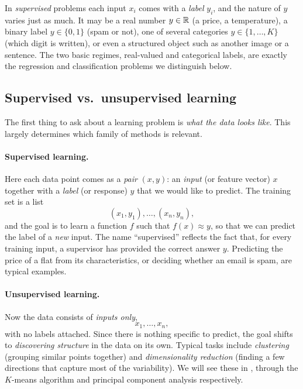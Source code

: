 In \emph{supervised} problems each input $x_i$ comes with a \emph{label} $y_i$,
and the nature of $y$ varies just as much. It may be a real number
$y \in \mathbb{R}$ (a price, a temperature), a binary label $y \in \{0, 1\}$ (spam or
not), one of several categories $y \in \{1, \dots, K\}$ (which digit is written),
or even a structured object such as another image or a sentence. The two basic
regimes, real-valued and categorical labels, are exactly the regression and
classification problems we distinguish below.

\subsection{Supervised vs.\ unsupervised learning}

The first thing to ask about a learning problem is \emph{what the data looks
like}. This largely determines which family of methods is relevant.

\paragraph{Supervised learning.}
Here each data point comes as a \emph{pair} $(x, y)$: an \emph{input} (or
feature vector) $x$ together with a \emph{label} (or response) $y$ that we would
like to predict. The training set is a list
\[
(x_1, y_1), \dots, (x_n, y_n),
\]
and the goal is to learn a function $f$ such that $f(x) \approx y$, so that we
can predict the label of a \emph{new} input. The name ``supervised'' reflects
the fact that, for every training input, a supervisor has provided the correct
answer $y$. Predicting the price of a flat from its characteristics, or deciding
whether an email is spam, are typical examples.

\paragraph{Unsupervised learning.}
Now the data consists of \emph{inputs only},
\[
x_1, \dots, x_n,
\]
with no labels attached. Since there is nothing specific to predict, the goal
shifts to \emph{discovering structure} in the data on its own. Typical tasks
include \emph{clustering} (grouping similar points together) and \emph{dimensionality
reduction} (finding a few directions that capture most of the variability). We will see these in , through the $K$-means algorithm and principal component
analysis respectively.

